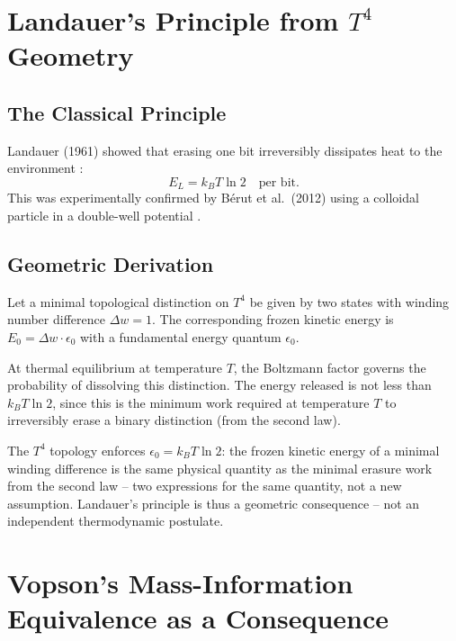 \section{Landauer's Principle from \(T^4\) Geometry}

\subsection{The Classical Principle}

Landauer (1961) showed that erasing one bit irreversibly dissipates
heat to the environment \cite{Landauer1961}:
\begin{equation}
  E_L = k_B T \ln 2 \quad \text{per bit.}
  \label{eq:landauer}
\end{equation}
This was experimentally confirmed by Bérut et al.\ (2012)
using a colloidal particle in a double-well potential \cite{Berut2012}.

\subsection{Geometric Derivation}

Let a minimal topological distinction on \(T^4\) be given by two
states with winding number difference \(\Delta w = 1\).
The corresponding frozen kinetic energy is
\(E_0 = \Delta w \cdot \epsilon_0\) with a fundamental energy
quantum \(\epsilon_0\).

At thermal equilibrium at temperature \(T\), the Boltzmann factor
governs the probability of dissolving this distinction.
The energy released is not less than \(k_B T \ln 2\),
since this is the minimum work required at temperature \(T\)
to irreversibly erase a binary distinction (from the second law).

The \(T^4\) topology enforces \(\epsilon_0 = k_B T \ln 2\):
the frozen kinetic energy of a minimal winding difference is the same
physical quantity as the minimal erasure work from the second law --
two expressions for the same quantity, not a new assumption.
Landauer's principle is thus a geometric consequence --
not an independent thermodynamic postulate.

\section{Vopson's Mass-Information Equivalence as a Consequence}

